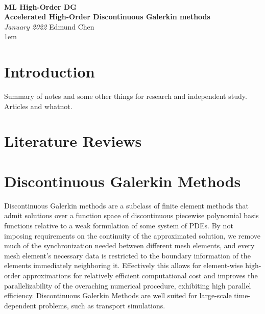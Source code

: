 \documentclass[openany]{book}
\makeatletter
\renewcommand\tableofcontents{%
    \@starttoc{toc}%
}
\newcommand{\SheetTitle}[4]{
  {\noindent\huge\bf  \\[0\baselineskip] {\selectfont ML High-Order DG}}\\[1.5\baselineskip] %
  { {\bf \selectfont #1}\\ {\textit{\selectfont January 2022}}} {\hfill\normalsize \textsf{Edmund Chen}} %
  \\[-0.5\baselineskip]}
\renewcommand{\maketitle}{\bgroup\setlength{\parindent}{0pt}
  \LARGE \bf\selectfont \@title

  \@author
\egroup
}
\makeatother
\begin{document}
\thispagestyle{empty}

\SheetTitle{Accelerated High-Order Discontinuous Galerkin methods} \hfill \\

\vspace{1em}
{\footnotesize 
  
\tableofcontents}

\raggedright
\section{Introduction}
Summary of notes and some other things for research and independent study. Articles and whatnot.

\section{Literature Reviews}

\section{Discontinuous Galerkin Methods}
Discontinuous Galerkin methods are a subclass of finite element methods that admit solutions over a function space of discontinuous piecewise polynomial basis functions relative to a weak formulation of some system of PDEs. By not imposing requirements on the continuity of the approximated solution, we remove much of the synchronization needed between different mesh elements, and every mesh element's necessary data is restricted to the boundary information of the elements immediately neighboring it. Effectively this allows for element-wise high-order approximations for relatively efficient computational cost and improves the parallelizability of the overaching numerical procedure, exhibiting high parallel efficiency. Discontinuous Galerkin Methods are well suited for large-scale time-dependent problems, such as transport simulations.
\end{document}
